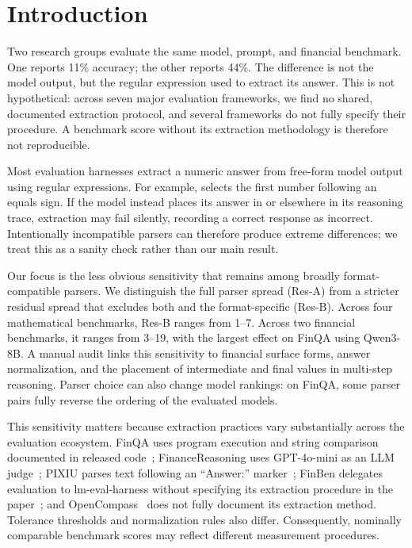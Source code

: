 \section{Introduction}
\label{sec:introduction}

Two research groups evaluate the same model, prompt, and financial benchmark. One reports 11\% accuracy; the other reports 44\%. The difference is not the model output, but the regular expression used to extract its answer. This is not hypothetical: across seven major evaluation frameworks, we find no shared, documented extraction protocol, and several frameworks do not fully specify their procedure. A benchmark score without its extraction methodology is therefore not reproducible.

Most evaluation harnesses extract a numeric answer from free-form model output using regular expressions. For example, \numparser{} selects the first number following an equals sign. If the model instead places its answer in \boxedparser{} or elsewhere in its reasoning trace, extraction may fail silently, recording a correct response as incorrect. Intentionally incompatible parsers can therefore produce extreme differences; we treat this as a sanity check rather than our main result.

Our focus is the less obvious sensitivity that remains among broadly format-compatible parsers. We distinguish the full parser spread (Res-A) from a stricter residual spread that excludes both \numparser{} and the format-specific \boxedparser{} (Res-B). Across four mathematical benchmarks, Res-B ranges from 1--7\pp{}. Across two financial benchmarks, it ranges from 3--19\pp{}, with the largest effect on FinQA using Qwen3-8B. A manual audit links this sensitivity to financial surface forms, answer normalization, and the placement of intermediate and final values in multi-step reasoning. Parser choice can also change model rankings: on FinQA, some parser pairs fully reverse the ordering of the evaluated models.

This sensitivity matters because extraction practices vary substantially across the evaluation ecosystem. FinQA uses program execution and string comparison documented in released code~\cite{chen2021finqa}; FinanceReasoning uses GPT-4o-mini as an LLM judge~\cite{zhang2025financereasoning}; PIXIU parses text following an ``Answer:'' marker~\cite{xie2023pixiu}; FinBen delegates evaluation to lm-eval-harness without specifying its extraction procedure in the paper~\cite{xie2024finben}; and OpenCompass~\cite{opencompass2023} does not fully document its extraction method. Tolerance thresholds and normalization rules also differ. Consequently, nominally comparable benchmark scores may reflect different measurement procedures.

